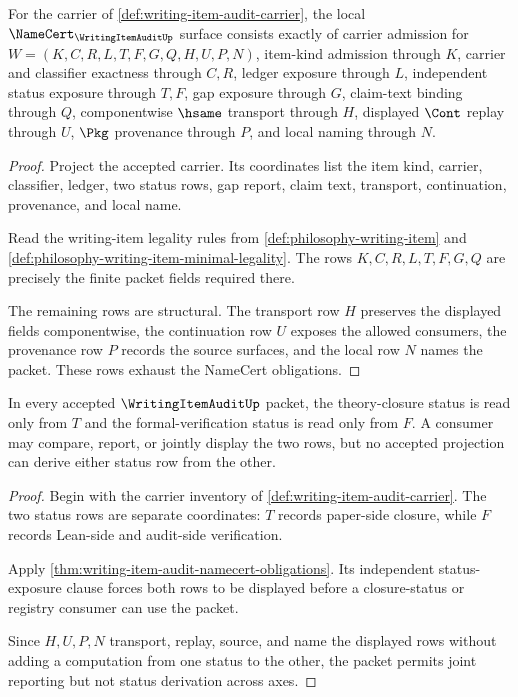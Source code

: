 \begin{theorem}
\label{thm:writing-item-audit-namecert-obligations}
For the carrier of \autoref{def:writing-item-audit-carrier}, the local $\NameCert_{\WritingItemAuditUp}$ surface consists exactly of carrier admission for $W=(K,C,R,L,T,F,G,Q,H,U,P,N)$, item-kind admission through $K$, carrier and classifier exactness through $C,R$, ledger exposure through $L$, independent status exposure through $T,F$, gap exposure through $G$, claim-text binding through $Q$, componentwise $\hsame$ transport through $H$, displayed $\Cont$ replay through $U$, $\Pkg$ provenance through $P$, and local naming through $N$.
\end{theorem}
\begin{proof}
Project the accepted carrier. Its coordinates list the item kind, carrier, classifier, ledger, two status rows, gap report, claim text, transport, continuation, provenance, and local name.

Read the writing-item legality rules from \autoref{def:philosophy-writing-item} and \autoref{def:philosophy-writing-item-minimal-legality}. The rows $K,C,R,L,T,F,G,Q$ are precisely the finite packet fields required there.

The remaining rows are structural. The transport row $H$ preserves the displayed fields componentwise, the continuation row $U$ exposes the allowed consumers, the provenance row $P$ records the source surfaces, and the local row $N$ names the packet. These rows exhaust the NameCert obligations.
\end{proof}

\begin{theorem}
\label{thm:writing-item-audit-axis-separation}
In every accepted $\WritingItemAuditUp$ packet, the theory-closure status is read only from $T$ and the formal-verification status is read only from $F$. A consumer may compare, report, or jointly display the two rows, but no accepted projection can derive either status row from the other.
\end{theorem}
\begin{proof}
Begin with the carrier inventory of \autoref{def:writing-item-audit-carrier}. The two status rows are separate coordinates: $T$ records paper-side closure, while $F$ records Lean-side and audit-side verification.

Apply \autoref{thm:writing-item-audit-namecert-obligations}. Its independent status-exposure clause forces both rows to be displayed before a closure-status or registry consumer can use the packet.

Since $H,U,P,N$ transport, replay, source, and name the displayed rows without adding a computation from one status to the other, the packet permits joint reporting but not status derivation across axes.
\end{proof}


